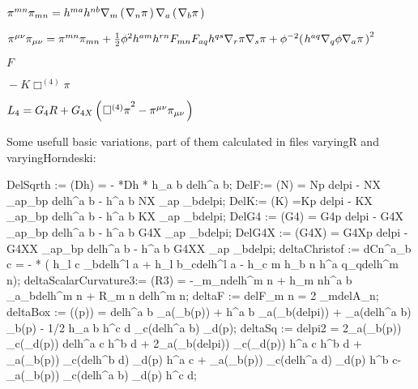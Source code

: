 \documentclass[10pt]{article}
\newcommand\brwrap[3]{%
  \setbox0=\hbox{$#2$}
  \left#1\vbox to \the\ht0{\hbox to 0pt{}}\right.\kern-.2em
  \begingroup #2\endgroup\kern-.15em
  \left.\vbox to \the\ht0{\hbox to 0pt{}}\right#3
}
\begin{document}
\begin{adjustwidth}{1em}{0cm}${}\pi^{m n}\pi_{m n} = h^{m a} h^{n b} \nabla_{m}\brwrap{(}{\nabla_{n}{\pi}}{)} \nabla_{a}\brwrap{(}{\nabla_{b}{\pi}}{)}$\end{adjustwidth}
\begin{adjustwidth}{1em}{0cm}${}\pi^{\mu \nu}\pi_{\mu \nu} = \pi^{m n}\pi_{m n}+\frac{1}{2}{\phi}^{2} h^{a m} h^{r n} F_{m n} F_{a q} h^{q s} \nabla_{r}{\pi} \nabla_{s}{\pi}+{\phi}^{-2} {\brwrap{(}{h^{a q} \nabla_{q}{\phi} \nabla_{a}{\pi}}{)}}^{2}$\end{adjustwidth}
\begin{adjustwidth}{1em}{0cm}${}F$\end{adjustwidth}
\begin{adjustwidth}{1em}{0cm}${}-K \Box^{(4)}{\pi}$\end{adjustwidth}
\begin{adjustwidth}{1em}{0cm}${}{L_{4}} = {G_{4}} R+G_{4X} \brwrap{(}{{\Box^{(4)}{\pi}}^{2}-\pi^{\mu \nu}\pi_{\mu \nu}}{)}$\end{adjustwidth}
Some usefull basic variations, part of them calculated in files varyingR and varyingHorndeski:
\begin{python}
DelSqrth := \delta(Dh) = - *Dh * h_{a b} delh^{a b};
DelF:= \delta(N) = Np delpi -  NX \nabla_{a}{p}\nabla_{b}{p}  delh^{a b} - h^{a b} NX \nabla_{a}{p} \nabla_{b}{delpi}; 
DelK:= \delta(K) =Kp delpi -  KX \nabla_{a}{p}\nabla_{b}{p}  delh^{a b} - h^{a b} KX \nabla_{a}{p} \nabla_{b}{delpi}; 
DelG4 := \delta(G4) = G4p delpi -  G4X \nabla_{a}{p}\nabla_{b}{p}  delh^{a b} - h^{a b} G4X \nabla_{a}{p} \nabla_{b}{delpi};
DelG4X := \delta(G4X) = G4Xp delpi -  G4XX \nabla_{a}{p}\nabla_{b}{p}  delh^{a b} - h^{a b} G4XX \nabla_{a}{p} \nabla_{b}{delpi};
deltaChristof := dCn^{a}_{b c} = - * ( h_{l c} \nabla_{b}{delh^{l a}} +  h_{l b}\nabla_{c}{delh^{l a}} - h_{c m} h_{b n} h^{a q}\nabla_{q}{delh^{m n}});
deltaScalarCurvature3:= \delta(R3) = -\nabla_{m}{\nabla_{n}{delh^{m n}}} + h_{m n}h^{a b} \nabla_{a}{\nabla_{b}{delh^{m n}}} + R_{m n} delh^{m n};
deltaF := delF_{m n} = 2 \nabla_{m}{delA_{n}};
deltaBox := \delta(\Box(p)) = delh^{a b} \nabla_{a}(\nabla_{b}(p)) + h^{a b} \nabla_{a}(\nabla_{b}(delpi)) + \nabla_{a}(delh^{a b}) \nabla_{b}(p) -  1/2 h_{a b} h^{c d} \nabla_{c}(delh^{a b}) \nabla_{d}(p);
deltaSq := delpi2 = 2\nabla_{a}(\nabla_{b}(p)) \nabla_{c}(\nabla_{d}(p)) delh^{a c} h^{b d} + 2\nabla_{a}(\nabla_{b}(delpi)) \nabla_{c}(\nabla_{d}(p)) h^{a c} h^{b d} + \nabla_{a}(\nabla_{b}(p)) \nabla_{c}(delh^{b d}) \nabla_{d}(p) h^{a c} + \nabla_{a}(\nabla_{b}(p)) \nabla_{c}(delh^{a d}) \nabla_{d}(p) h^{b c}-\nabla_{a}(\nabla_{b}(p)) \nabla_{c}(delh^{a b}) \nabla_{d}(p) h^{c d};
\end{python}
\end{document}
